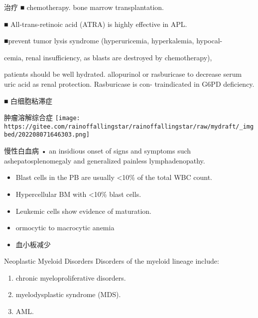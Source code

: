 \documentclass[
  ignorenonframetext,
]{beamer}
\begin{document}
\begin{frame}
\begin{block}{治疗}
\protect\hypertarget{ux6cbbux7597}{}
■ chemotherapy. bone marrow transplantation.

■ All-trans-retinoic acid (ATRA) is highly effective in APL.

■prevent tumor lysis syndrome (hyperuricemia, hyperkalemia, hypocal-

cemia, renal insufficiency, as blasts are destroyed by chemotherapy),

patients should be well hydrated. allopurinol or rasburicase to decrease
serum uric acid as renal protection. Rasburicase is con- traindicated in
G6PD deficiency.

■ 白细胞粘滞症
\end{block}
\end{frame}

\begin{frame}
\begin{block}{肿瘤溶解综合症}
\protect\hypertarget{ux80bfux7624ux6eb6ux89e3ux7efcux5408ux75c7}{}
\texttt{[image: https://gitee.com/rainoffallingstar/rainoffallingstar/raw/mydraft/\_imgbed/202208071646303.png]}
\end{block}
\end{frame}

\begin{frame}
\begin{block}{慢性白血病}
\protect\hypertarget{ux6162ux6027ux767dux8840ux75c5}{}
• an insidious onset of signs and symptoms such ashepatosplenomegaly and
generalized painless lymphadenopathy.

\begin{itemize}
\item
  Blast cells in the PB are usually \textless10\% of the total WBC
  count.
\item
  Hypercellular BM with \textless10\% blast cells.
\item
  Leukemic cells show evidence of maturation.
\item
  ormocytic to macrocytic anemia
\item
  血小板减少
\end{itemize}
\end{block}
\end{frame}

\begin{frame}
\begin{block}{Neoplastic Myeloid Disorders}
\protect\hypertarget{neoplastic-myeloid-disorders}{}
Disorders of the myeloid lineage include:

\begin{enumerate}
\item
  chronic myeloproliferative disorders.
\item
  myelodysplastic syndrome (MDS).
\item
  AML.
\end{enumerate}
\end{block}
\end{frame}
\end{document}
